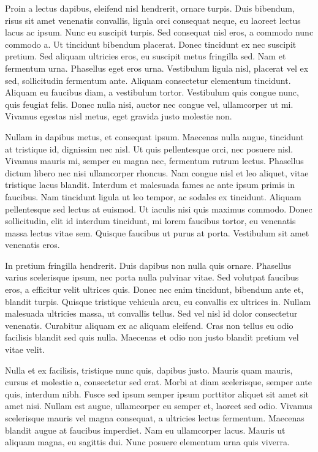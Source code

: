 Proin a lectus dapibus, eleifend nisl hendrerit, ornare turpis. Duis bibendum, risus sit amet venenatis convallis, ligula orci consequat neque, eu laoreet lectus lacus ac ipsum. Nunc eu suscipit turpis. Sed consequat nisl eros, a commodo nunc commodo a. Ut tincidunt bibendum placerat. Donec tincidunt ex nec suscipit pretium. Sed aliquam ultricies eros, eu suscipit metus fringilla sed. Nam et fermentum urna. Phasellus eget eros urna. Vestibulum ligula nisl, placerat vel ex sed, sollicitudin fermentum ante. Aliquam consectetur elementum tincidunt. Aliquam eu faucibus diam, a vestibulum tortor. Vestibulum quis congue nunc, quis feugiat felis. Donec nulla nisi, auctor nec congue vel, ullamcorper ut mi. Vivamus egestas nisl metus, eget gravida justo molestie non.

Nullam in dapibus metus, et consequat ipsum. Maecenas nulla augue, tincidunt at tristique id, dignissim nec nisl. Ut quis pellentesque orci, nec posuere nisl. Vivamus mauris mi, semper eu magna nec, fermentum rutrum lectus. Phasellus dictum libero nec nisi ullamcorper rhoncus. Nam congue nisl et leo aliquet, vitae tristique lacus blandit. Interdum et malesuada fames ac ante ipsum primis in faucibus. Nam tincidunt ligula ut leo tempor, ac sodales ex tincidunt. Aliquam pellentesque sed lectus at euismod. Ut iaculis nisi quis maximus commodo. Donec sollicitudin, elit id interdum tincidunt, mi lorem faucibus tortor, eu venenatis massa lectus vitae sem. Quisque faucibus ut purus at porta. Vestibulum sit amet venenatis eros.

In pretium fringilla hendrerit. Duis dapibus non nulla quis ornare. Phasellus varius scelerisque ipsum, nec porta nulla pulvinar vitae. Sed volutpat faucibus eros, a efficitur velit ultrices quis. Donec nec enim tincidunt, bibendum ante et, blandit turpis. Quisque tristique vehicula arcu, eu convallis ex ultrices in. Nullam malesuada ultricies massa, ut convallis tellus. Sed vel nisl id dolor consectetur venenatis. Curabitur aliquam ex ac aliquam eleifend. Cras non tellus eu odio facilisis blandit sed quis nulla. Maecenas et odio non justo blandit pretium vel vitae velit.

Nulla et ex facilisis, tristique nunc quis, dapibus justo. Mauris quam mauris, cursus et molestie a, consectetur sed erat. Morbi at diam scelerisque, semper ante quis, interdum nibh. Fusce sed ipsum semper ipsum porttitor aliquet sit amet sit amet nisi. Nullam est augue, ullamcorper eu semper et, laoreet sed odio. Vivamus scelerisque mauris vel magna consequat, a ultricies lectus fermentum. Maecenas blandit augue at faucibus imperdiet. Nam eu ullamcorper lacus. Mauris ut aliquam magna, eu sagittis dui. Nunc posuere elementum urna quis viverra.

